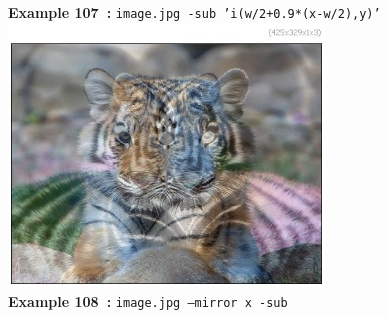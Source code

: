 \documentclass[a4paper,11pt,twoside]{book}
\begin{document}
\begin{center}
{\footnotesize \textbf{Example 107~:} \texttt{image.jpg -sub 'i(w/2+0.9*(x-w/2),y)'}}
\\\includegraphics[keepaspectratio=true,height=7cm,width=\textwidth]{img/gmic_def108.jpg}\\
{\footnotesize \textbf{Example 108~:} \texttt{image.jpg --mirror x -sub}}
\end{center}
\end{document}
